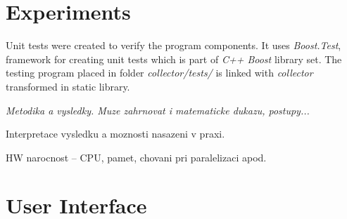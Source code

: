 






\chapter{Experiments}
Unit tests were created to verify the program components. It uses {\it Boost.Test},
framework for creating unit tests which is part of {\it C++ Boost} library set.
The testing program placed in folder {\it collector/tests/} is linked with
{\it collector} transformed in static library.

{\it
Metodika a vysledky. Muze zahrnovat i matematicke dukazu, postupy...

Interpretace vysledku a moznosti nasazeni v praxi.

HW narocnost -- CPU, pamet, chovani pri paralelizaci apod.
}




\chapter{User Interface}
\label{Label:UI}

